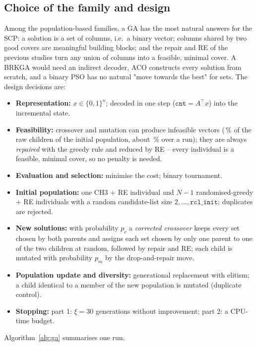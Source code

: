 \documentclass[11pt,a4paper]{article}
\begin{document}
\subsection{Choice of the family and design}
Among the population-based families, a GA has the most natural answers for the SCP: a solution is a set of columns, i.e.\ a binary vector; columns shared by two good covers are meaningful building blocks; and the repair and RE of the previous studies turn any union of columns into a feasible, minimal cover.
A BRKGA would need an indirect decoder, ACO constructs every solution from scratch, and a binary PSO has no natural "move towards the best" for sets.
The design decisions are:
\begin{itemize}
\item \textbf{Representation:} $x\in\{0,1\}^n$; decoded in one step ($\texttt{cnt}=A^\top x$) into the incremental state.
\item \textbf{Feasibility:} crossover and mutation can produce infeasible vectors (\rawInfeasibleInit\,\% of the raw children of the initial population, about \rawInfeasibleRun\,\% over a run); they are always \emph{repaired} with the greedy rule and reduced by RE -- every individual is a feasible, minimal cover, so no penalty is needed.
\item \textbf{Evaluation and selection:} minimise the cost; binary tournament.
\item \textbf{Initial population:} one CH3 + RE individual and $N-1$ randomised-greedy + RE individuals with a random candidate-list size $2,\dots,\texttt{rcl\_init}$; duplicates are rejected.
\item \textbf{New solutions:} with probability $p_c$ a \emph{corrected crossover} keeps every set chosen by both parents and assigns each set chosen by only one parent to one of the two children at random, followed by repair and RE; each child is mutated with probability $p_m$ by the drop-and-repair move.
\item \textbf{Population update and diversity:} generational replacement with elitism; a child identical to a member of the new population is mutated (duplicate control).
\item \textbf{Stopping:} part 1: $\xi=30$ generations without improvement; part 2: a CPU-time budget.
\end{itemize}
Algorithm~\ref{alg:ga} summarises one run.
\end{document}
